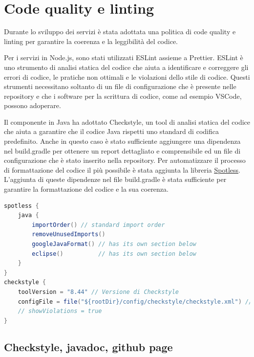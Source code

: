 \section{Code quality e linting} 
\label{code_quality}

Durante lo sviluppo dei servizi è stata adottata una politica di code quality e linting per garantire la coerenza e la leggibilità del codice.

\vspace{0.5cm}

Per i servizi in Node.js, sono stati utilizzati ESLint assieme a Prettier. ESLint è uno strumento di analisi statica del codice che aiuta a identificare e correggere gli errori di codice, le pratiche non ottimali e le violazioni dello stile di codice.
Questi strumenti necessitano soltanto di un file di configurazione che è presente nelle repository e che i software per la scrittura di codice, come ad esempio VSCode, possono adoperare.

\vspace{0.5cm}

Il componente in Java ha adottato Checkstyle, un tool di analisi statica del codice che aiuta a garantire che il codice Java rispetti uno standard di codifica predefinito. Anche in questo caso è stato sufficiente aggiungere una dipendenza nel build.gradle per ottenere un report dettagliato e comprensibile ed un file di configurazione che è stato inserito nella repository. Per automatizzare il processo di formattazione del codice il più possibile è stata aggiunta la libreria \href{https://github.com/diffplug/spotless}{\underline{Spotless}}. L'aggiunta di queste dipendenze nel file build.gradle è stata sufficiente per garantire la formattazione del codice e la sua coerenza.

\begin{lstlisting}[language=Java, caption={Code quality}, label=list:gradle_codequality]
spotless {
    java {
        importOrder() // standard import order
        removeUnusedImports()
        googleJavaFormat() // has its own section below
        eclipse()          // has its own section below
    }
}
checkstyle {
    toolVersion = "8.44" // Versione di Checkstyle
    configFile = file("${rootDir}/config/checkstyle/checkstyle.xml") // Configurazione di Checkstyle
    // showViolations = true
}
\end{lstlisting}


\subsection{Checkstyle, javadoc, github page }

